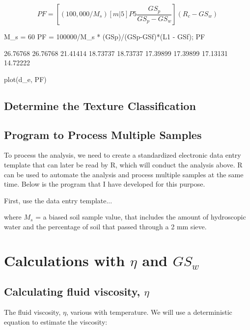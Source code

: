 \documentclass{tufte-handout}
\begin{document}
\begin{equation}
PF = [(100,000/M_s)[m|5]P5 \frac{GS_p}{GS_p - GS_w}](R_c - GS_w)
\end{equation}

\begin{Schunk}
\begin{Sinput}
 M_s = 60
 PF = 100000/M_s * (GSp)/(GSp-GSf)*(L1 - GSf); PF
\end{Sinput}
\begin{Soutput}
[1] 26.76768 26.76768 21.41414 18.73737 18.73737 17.39899 17.39899 17.13131 14.72222
\end{Soutput}
\begin{Sinput}
 plot(d_e, PF)
\end{Sinput}
\end{Schunk}

\subsection{Determine the Texture Classification}

\subsection{Program to Process Multiple Samples}

To process the analysis, we need to create a standardized electronic data entry template that can later be read by R, which will conduct the analysis above. R can be used to automate the analysis and process multiple samples at the same time. Below is the program that I have developed for this purpose. 

First, use the data entry template...

 

where $M_s$ = a biased soil sample value, that includes the amount of hydroscopic water and the percentage of soil that passed through a 2 mm sieve. 


\section{Calculations with $\eta$ and $GS_w$}

\subsection{Calculating fluid viscosity, $\eta$}

The fluid viscosity, $\eta$, various with temperature. We will use a deterministic equation to estimate the viscosity:
\end{document}
